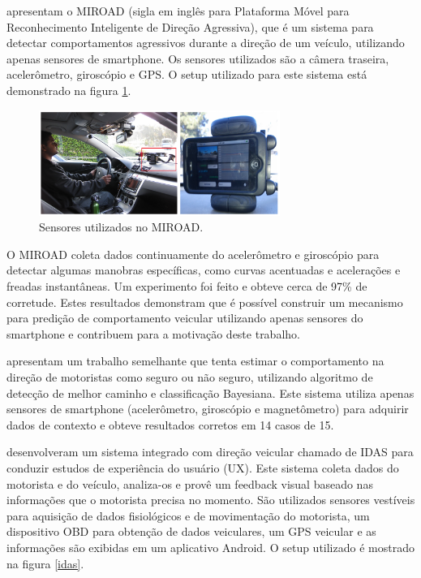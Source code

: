 
 apresentam o MIROAD (sigla em inglês para Plataforma Móvel para Reconhecimento
Inteligente de Direção Agressiva), que é um sistema para detectar comportamentos agressivos durante a direção de um veículo, utilizando
apenas sensores de smartphone. Os sensores utilizados são a câmera traseira, acelerômetro, giroscópio e GPS. O setup utilizado para este
sistema está demonstrado na figura \ref{miroad}.

\begin{figure}[h]
\centering
\includegraphics[width=0.7\textwidth]{images/miroad.png}
\caption{Sensores utilizados no MIROAD. \cite{johnson2011driving}}
\label{miroad}
\end{figure}

O MIROAD coleta dados continuamente do acelerômetro e giroscópio para detectar algumas manobras específicas, como curvas acentuadas
e acelerações e freadas instantâneas.
Um experimento foi feito e obteve cerca de 97\% de corretude. Estes resultados demonstram que é possível construir
um mecanismo para predição de comportamento veicular utilizando apenas sensores do smartphone e contribuem para a motivação deste trabalho.

 apresentam um trabalho semelhante que tenta estimar o comportamento na direção de motoristas como seguro ou
não seguro, utilizando algoritmo de detecção de melhor caminho e classificação Bayesiana. Este sistema utiliza
apenas sensores de smartphone (acelerômetro, giroscópio e magnetômetro) para adquirir dados de contexto e obteve
resultados corretos em 14 casos de 15.

 desenvolveram um sistema integrado com direção veicular chamado de IDAS para conduzir estudos de experiência
do usuário (UX). Este sistema coleta dados do motorista e do veículo, analiza-os e provê um feedback visual baseado
nas informações que o motorista precisa no momento. São utilizados sensores vestíveis para aquisição de dados
fisiológicos e de movimentação do motorista, um dispositivo OBD para obtenção de dados veiculares, um GPS veicular e as informações
são exibidas em um aplicativo Android. O setup utilizado é mostrado na figura \ref{idas}.

